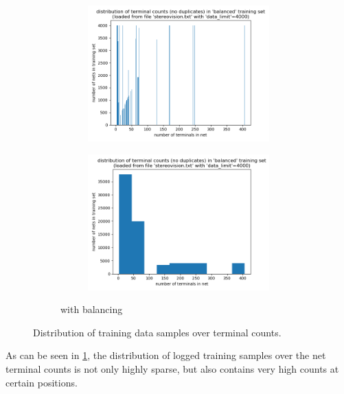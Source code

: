 \begin{figure}
\begin{subfigure}[b]{0.45\linewidth}
\begin{subfigure}[b]{\linewidth}
			\includegraphics[width=\linewidth]{plots/data-distribution-limited-fine.png}
		\end{subfigure}
		\begin{subfigure}[b]{\linewidth}
			\includegraphics[width=\linewidth]{plots/data-distribution-limited-coarse.png}
		\end{subfigure}
		\caption{with balancing}
	\end{subfigure}
	\caption{Distribution of training data samples over terminal counts.}
	\label{fig:data-hist}
\end{figure}

As can be seen in \ref{fig:data-hist}, the distribution of logged training samples over the net terminal counts is not only highly sparse, but also contains very high counts at certain positions.

